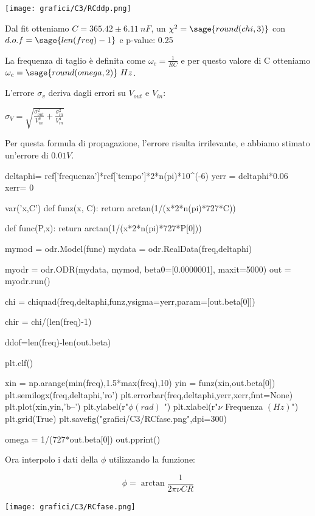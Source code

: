 \begin{center}
 \texttt{[image: grafici/C3/RCddp.png]}
\end{center}

Dal fit otteniamo $C=365.42 \pm  6.11\ nF $, un $\chi^2 = \sage{round(chi,3)}$ con $d.o.f=\sage{len(freq)-1}$ e p-value: 0.25 

La frequenza di taglio è definita come $\omega_c = \frac{1}{RC}$ e per questo valore di C otteniamo $\omega_c = \sage{round(omega,2)}\ Hz$.

L'errore $\sigma_v$ deriva dagli errori su $V_{out}$ e $V_{in}$:

$\sigma_V = \sqrt{\frac{\sigma_{out}^2}{V_{in}^2} + \frac{\sigma_{in}^2}{V_{in}^4} }$

Per questa formula di propagazione, l'errore risulta irrilevante, e abbiamo stimato un'errore di $0.01 V$.
\begin{sagesilent}

deltaphi= rcf['frequenza']*rcf['tempo']*2*n(pi)*10^(-6)
yerr = deltaphi*0.06
xerr= 0

var('x,C')
def funz(x, C):
    return arctan(1/(x*2*n(pi)*727*C))
    
def func(P,x):
    return arctan(1/(x*2*n(pi)*727*P[0]))
    
mymod = odr.Model(func)
mydata = odr.RealData(freq,deltaphi)

myodr = odr.ODR(mydata, mymod, beta0=[0.0000001], maxit=5000)
out = myodr.run()

chi = chiquad(freq,deltaphi,funz,ysigma=yerr,param=[out.beta[0]])

chir = chi/(len(freq)-1)

ddof=len(freq)-len(out.beta) 
 
plt.clf()

xin = np.arange(min(freq),1.5*max(freq),10)
yin = funz(xin,out.beta[0])
plt.semilogx(freq,deltaphi,'ro')
plt.errorbar(freq,deltaphi,yerr,xerr,fmt=None)
plt.plot(xin,yin,'b--')
plt.ylabel(r"$\phi (rad)$ ")
plt.xlabel(r"$\nu$ Frequenza $(Hz)$")
plt.grid(True)
plt.savefig("grafici/C3/RCfase.png",dpi=300)

omega = 1/(727*out.beta[0])
out.pprint()

\end{sagesilent}


Ora interpolo i dati della $ \phi$ utilizzando la funzione:

$$ \phi = \arctan \frac{1}{2\pi\nu C R} $$


\begin{center}
 \texttt{[image: grafici/C3/RCfase.png]}
\end{center}


